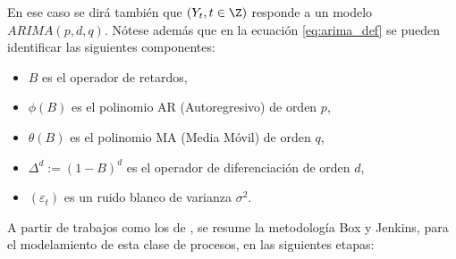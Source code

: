 \documentclass[12pt,oneside]{book}\usepackage[]{graphicx}\usepackage[]{color}
\theoremstyle{definition} %
\begin{document}
En ese caso se dirá también que $(Y_t, t \in \Z)$ responde a un modelo $ARIMA(p,d,q)$. Nótese además que en la ecuación \ref{eq:arima_def} se pueden identificar las siguientes componentes:

\begin{itemize}
\item $B$ es el operador de retardos,
\item $\phi(B)$ es el polinomio AR (Autoregresivo) de orden $p$,
\item $\theta  (B)$ es el polinomio MA (Media Móvil) de orden $q$,
\item $\Delta^d:=(1-B)^d$ es el operador de diferenciación de orden $d$,
\item $(\varepsilon_t)$ es un ruido blanco de varianza $\sigma^2$.
\end{itemize}



A partir de trabajos como los de \citeauthor{chatfield1996,capa2016seriest}, se resume la metodología Box y Jenkins, para el modelamiento de esta clase de procesos, en las siguientes etapas:
\end{document}
